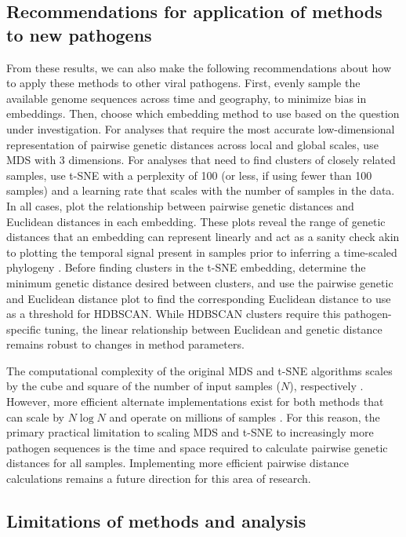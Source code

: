 \documentclass[webpdf,contemporary,large,single]{oup-authoring-template}%
\theoremstyle{thmstyleone}%
\theoremstyle{thmstyletwo}%
\theoremstyle{thmstylethree}%
\begin{document}
\subsection{Recommendations for application of methods to new pathogens}

From these results, we can also make the following recommendations about how to apply these methods to other viral pathogens.
First, evenly sample the available genome sequences across time and geography, to minimize bias in embeddings.
Then, choose which embedding method to use based on the question under investigation.
For analyses that require the most accurate low-dimensional representation of pairwise genetic distances across local and global scales, use MDS with 3 dimensions.
For analyses that need to find clusters of closely related samples, use t-SNE with a perplexity of 100 (or less, if using fewer than 100 samples) and a learning rate that scales with the number of samples in the data.
In all cases, plot the relationship between pairwise genetic distances and Euclidean distances in each embedding.
These plots reveal the range of genetic distances that an embedding can represent linearly and act as a sanity check akin to plotting the temporal signal present in samples prior to inferring a time-scaled phylogeny \citep{Rambaut2016,Sagulenko2018}.
Before finding clusters in the t-SNE embedding, determine the minimum genetic distance desired between clusters, and use the pairwise genetic and Euclidean distance plot to find the corresponding Euclidean distance to use as a threshold for HDBSCAN.
While HDBSCAN clusters require this pathogen-specific tuning, the linear relationship between Euclidean and genetic distance remains robust to changes in method parameters.

The computational complexity of the original MDS and t-SNE algorithms scales by the cube and square of the number of input samples ($N$), respectively \citep{Yang2006,maaten2008visualizing}.
However, more efficient alternate implementations exist for both methods that can scale by $N\log{N}$ and operate on millions of samples \citep{Yang2006,Delicado2024,Yang2013,vandermaaten2013,vandermaaten2014}.
For this reason, the primary practical limitation to scaling MDS and t-SNE to increasingly more pathogen sequences is the time and space required to calculate pairwise genetic distances for all samples.
Implementing more efficient pairwise distance calculations remains a future direction for this area of research.

\subsection{Limitations of methods and analysis}
\end{document}
